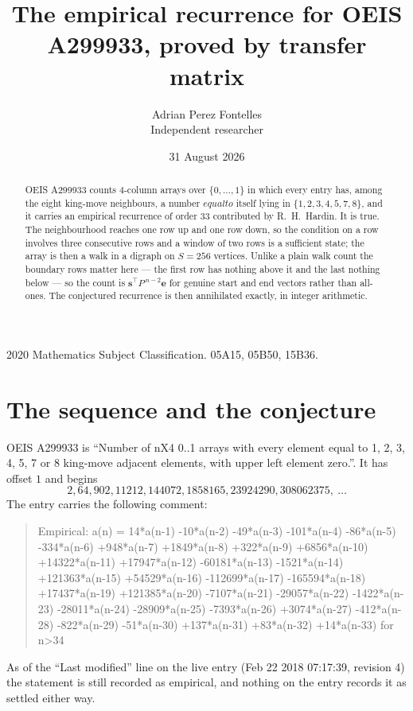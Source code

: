 \documentclass[11pt,a4paper]{article}
\title{The empirical recurrence for OEIS A299933, proved by transfer matrix}
\author{Adrian Perez Fontelles\\ \small Independent researcher}
\date{31 August 2026}
\theoremstyle{plain}
\theoremstyle{definition}
\begin{document}
\maketitle

\begin{abstract}
OEIS A299933 counts $4$-column arrays over $\{0,\dots,1\}$ in which every entry has,
among the eight king-move neighbours, a number $equal to$ itself lying in $\{1,2,3,4,5,7,8\}$, and it carries an empirical
recurrence of order $33$ contributed by R.~H.~Hardin. It is true. The neighbourhood
reaches one row up and one row down, so the condition on a row involves three consecutive
rows and a window of two rows is a sufficient state; the array is then a walk in a digraph
on $S=256$ vertices. Unlike a plain walk count the boundary rows matter here --- the first
row has nothing above it and the last nothing below --- so the count is
$\mathbf{s}^{\!\top}P^{\,n-2}\mathbf{e}$ for genuine start and end vectors rather than
all-ones. The conjectured recurrence is then annihilated exactly, in integer arithmetic.
\end{abstract}

\noindent\small 2020 Mathematics Subject Classification. 05A15, 05B50, 15B36.\normalsize

\section{The sequence and the conjecture}

OEIS A299933 is ``Number of nX4 0..1 arrays with every element equal to 1, 2, 3, 4, 5, 7 or 8 king-move adjacent elements, with upper left element zero.''. It has offset
$1$ and begins
\[
2, 64, 902, 11212, 144072, 1858165, 23924290, 308062375,\ \dots
\]
The entry carries the following comment:
\begin{quote}\small
Empirical: a(n) = 14*a(n-1) -10*a(n-2) -49*a(n-3) -101*a(n-4) -86*a(n-5) -334*a(n-6) +948*a(n-7) +1849*a(n-8) +322*a(n-9) +6856*a(n-10) +14322*a(n-11) +17947*a(n-12) -60181*a(n-13) -1521*a(n-14) +121363*a(n-15) +54529*a(n-16) -112699*a(n-17) -165594*a(n-18) +17437*a(n-19) +121385*a(n-20) -7107*a(n-21) -29057*a(n-22) -1422*a(n-23) -28011*a(n-24) -28909*a(n-25) -7393*a(n-26) +3074*a(n-27) -412*a(n-28) -822*a(n-29) -51*a(n-30) +137*a(n-31) +83*a(n-32) +14*a(n-33) for n>34
\end{quote}
As of the ``Last modified'' line on the live entry (Feb 22 2018 07:17:39, revision
4) the statement is still recorded as empirical, and nothing on the entry
records it as settled either way.
\end{document}
